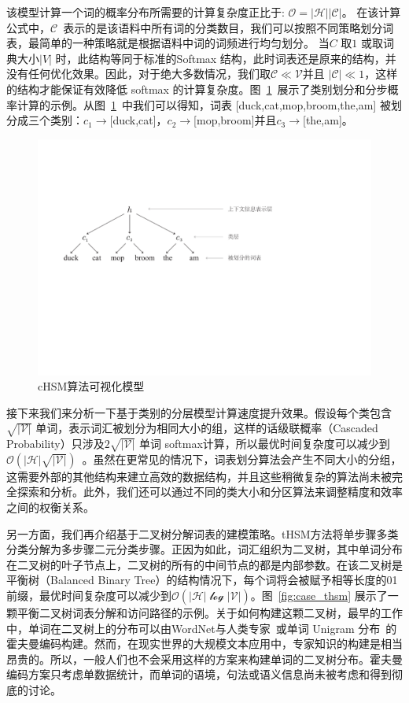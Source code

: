 该模型计算一个词的概率分布所需要的计算复杂度正比于: $\mathcal{O =|H||C|}$。 在该计算公式中，$\mathcal{C}$~表示的是该语料中所有词的分类数目，我们可以按照不同策略划分词表，最简单的一种策略就是根据语料中词的词频进行均匀划分。 当$C$ 取$1$ 或取词典大小$|V|$ 时，此结构等同于标准的Softmax 结构，此时词表还是原来的结构，并没有任何优化效果。因此，对于绝大多数情况，我们取$\mathcal{C} \ll \mathcal{V}$并且 $|\mathcal{C}|\ll 1$，这样的结构才能保证有效降低 softmax 的计算复杂度。图~\ref{fig:case_hsm}~展示了类别划分和分步概率计算的示例。从图~\ref{fig:case_hsm}~中我们可以得知，词表 [duck,cat,mop,broom,the,am] 被划分成三个类别：$c_1\to$[duck,cat]，$c_2\to$[mop,broom]并且$c_3\to$[the,am]。
\begin{figure}[!t]
  \centering
\includegraphics[width=.9\linewidth]{./figures/case_chsm.pdf}
\caption{cHSM算法可视化模型}\label{fig:case_hsm}
\end{figure}

接下来我们来分析一下基于类别的分层模型计算速度提升效果。假设每个类包含 $\sqrt{\mathcal{|V|}}$ 单词，表示词汇被划分为相同大小的组，这样的话级联概率（Cascaded Probability）只涉及$2\sqrt{\mathcal{|V|}}$ 单词 softmax计算，所以最优时间复杂度可以减少到$\mathcal{O}(\mathcal{|H|}\sqrt{\mathcal{|V|}})$~。虽然在更常见的情况下，词表划分算法会产生不同大小的分组，这需要外部的其他结构来建立高效的数据结构，并且这些稍微复杂的算法尚未被完全探索和分析。此外，我们还可以通过不同的类大小和分区算法来调整精度和效率之间的权衡关系。

另一方面，我们再介绍基于二叉树分解词表的建模策略。tHSM方法将单步骤多类分类分解为多步骤二元分类步骤。正因为如此，词汇组织为二叉树，其中单词分布在二叉树的叶子节点上，二叉树的所有的中间节点的都是内部参数。在该二叉树是平衡树（Balanced Binary Tree）的结构情况下，每个词将会被赋予相等长度的01前缀，最优时间复杂度可以减少到$\mathcal{O(|H|\log \mathcal{|V|})}$。图~\ref{fig:case_thsm} 展示了一颗平衡二叉树词表分解和访问路径的示例。关于如何构建这颗二叉树，最早的工作中，单词在二叉树上的分布可以由WordNet与人类专家~或单词 Unigram 分布~的霍夫曼编码构建。然而，在现实世界的大规模文本应用中，专家知识的构建是相当昂贵的。所以，一般人们也不会采用这样的方案来构建单词的二叉树分布。霍夫曼编码方案只考虑单数据统计，而单词的语境，句法或语义信息尚未被考虑和得到彻底的讨论。

